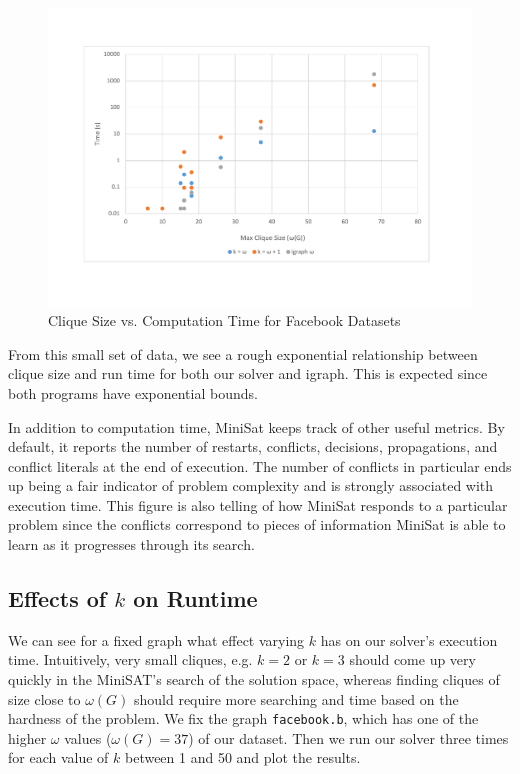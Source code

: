 \documentclass[]{article}
\begin{document}
	\begin{figure}[H]
		\caption{Clique Size vs. Computation Time for Facebook Datasets}
		\includegraphics[width=4.5 in]{graph1}
		\centering
	\end{figure}
	
	From this small set of data, we see a rough exponential relationship between clique size and run time for both our solver and igraph. This is expected since both programs have exponential bounds.
	
	In addition to computation time, MiniSat keeps track of other useful metrics. By default, it reports the number of restarts, conflicts, decisions, propagations, and conflict literals at the end of execution. The number of conflicts in particular ends up being a fair indicator of problem complexity and is strongly associated with execution time. This figure is also telling of how MiniSat responds to a particular problem since the conflicts correspond to pieces of information MiniSat is able to learn as it progresses through its search.
	
	\subsection{Effects of $k$ on Runtime}
	We can see for a fixed graph what effect varying $k$ has on our solver's execution time. Intuitively, very small cliques, e.g. $k = 2$ or $k = 3$ should come up very quickly in the MiniSAT's search of the solution space, whereas finding cliques of size close to $\omega(G)$ should require more searching and time based on the hardness of the problem. We fix the graph \texttt{facebook.b}, which has one of the higher $\omega$ values ($\omega(G) = 37$) of our dataset. Then we run our solver three times for each value of $k$ between 1 and 50 and plot the results.
	
\end{document}
